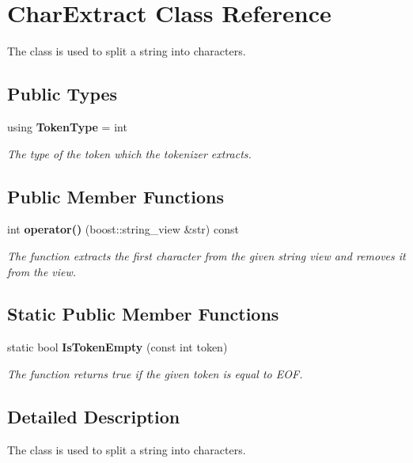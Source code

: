 \section{Char\+Extract Class Reference}
\label{classmlpack_1_1data_1_1CharExtract}


The class is used to split a string into characters.  


\subsection*{Public Types}
\begin{DoxyCompactItemize}
\item 
using \textbf{ Token\+Type} = int
\begin{DoxyCompactList}\small\item\em The type of the token which the tokenizer extracts. \end{DoxyCompactList}\end{DoxyCompactItemize}
\subsection*{Public Member Functions}
\begin{DoxyCompactItemize}
\item 
int \textbf{ operator()} (boost\+::string\+\_\+view \&str) const
\begin{DoxyCompactList}\small\item\em The function extracts the first character from the given string view and removes it from the view. \end{DoxyCompactList}\end{DoxyCompactItemize}
\subsection*{Static Public Member Functions}
\begin{DoxyCompactItemize}
\item 
static bool \textbf{ Is\+Token\+Empty} (const int token)
\begin{DoxyCompactList}\small\item\em The function returns true if the given token is equal to E\+OF. \end{DoxyCompactList}\end{DoxyCompactItemize}


\subsection{Detailed Description}
The class is used to split a string into characters. 

